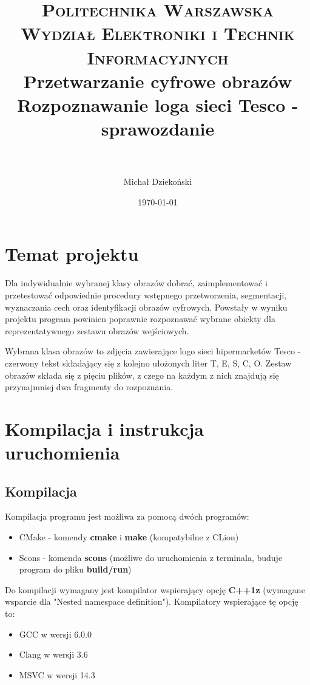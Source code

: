 \documentclass[11pt,a4paper]{article} %
\title{
\normalfont \normalsize
\textsc{Politechnika Warszawska \\Wydział Elektroniki i Technik Informacyjnych} \\ [25pt] %
\Large Przetwarzanie cyfrowe obrazów\\
\huge Rozpoznawanie loga sieci Tesco - sprawozdanie \\ %
\horrule{1pt} \\[0.5cm] %
}
\author{Michał Dziekoński} %
\date{\normalsize\today} %
\numberwithin{equation}{section} %
\numberwithin{figure}{section} %
\numberwithin{table}{section} %
\begin{document}
\maketitle %

\section{Temat projektu}

Dla  indywidualnie  wybranej  klasy  obrazów  dobrać,  zaimplementować i  przetestować odpowiednie procedury wstępnego przetworzenia, segmentacji, wyznaczania   cech oraz identyfikacji obrazów cyfrowych. Powstały w wyniku projektu program powinien poprawnie rozpoznawać wybrane obiekty dla reprezentatywnego zestawu obrazów wejściowych.

Wybrana klasa obrazów to zdjęcia zawierające logo sieci hipermarketów Tesco - czerwony tekst składający się z kolejno ułożonych liter T, E, S, C, O. Zestaw obrazów składa się z pięciu plików, z czego na każdym z nich znajdują się przynajmniej dwa fragmenty do rozpoznania.

\section{Kompilacja i instrukcja uruchomienia}

\subsection{Kompilacja}

Kompilacja programu jest możliwa za pomocą dwóch programów:
\begin{itemize}
	\item CMake - komendy \textbf{cmake} i \textbf{make} (kompatybilne z CLion)
	\item Scons - komenda \textbf{scons} (możliwe do uruchomienia z terminala, buduje program do pliku \textbf{build/run})
\end{itemize}

Do kompilacji wymagany jest kompilator wspierający opcję \textbf{C++1z} (wymagane wsparcie dla "Nested namespace definition"). Kompilatory wspierające tę opcję to:
\begin{itemize}
	\item GCC w wersji 6.0.0
	\item Clang w wersji 3.6
	\item MSVC w wersji 14.3
\end{itemize}
\end{document}
